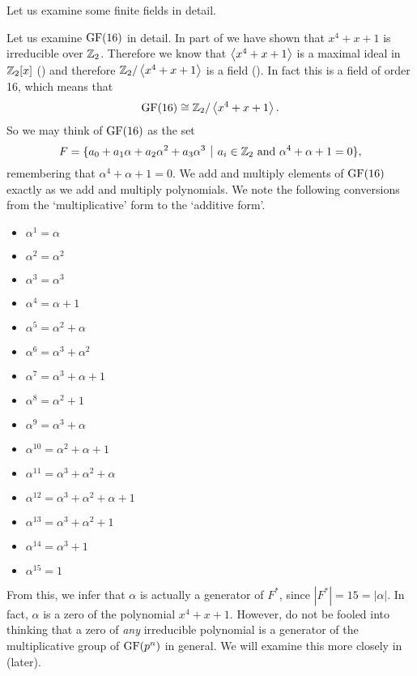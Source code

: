 Let us examine some finite fields in detail.
\begin{example}\label{example-GF16-analysis}
    Let us examine $\mathrm{GF}(16)$ in detail. In part of  we have shown that $x^4 + x + 1$ is irreducible over $\mathbb{Z}_2$. Therefore we know that $\left\langle x^4 + x + 1\right\rangle$ is a maximal ideal in $\mathbb{Z}_2[x]$ () and therefore $\mathbb{Z}_2/\left\langle x^4+x+1\right\rangle$ is a field (). In fact this is a field of order 16, which means that
    \[
        \mathrm{GF}(16) \cong \mathbb{Z}_2/\left\langle x^4+x+1\right\rangle.
    \]
    So we may think of $\mathrm{GF}(16)$ as the set
    \[
        F = \{a_0 + a_1\alpha + a_2\alpha^2 + a_3\alpha^3 \vert a_i \in \Z_2 \text{ and } \alpha^4 + \alpha + 1 = 0\},
    \]
    remembering that $\alpha^4 + \alpha + 1 = 0$. We add and multiply elements of $\mathrm{GF}(16)$ exactly as we add and multiply polynomials. We note the following conversions from the `multiplicative' form to the `additive form'.
    \begin{multicols}{3}
        \begin{itemize}
            \item $\alpha^1 = \alpha$
            \item $\alpha^2 = \alpha^2$
            \item $\alpha^3 = \alpha^3$
            \item $\alpha^4 = \alpha + 1$
            \item $\alpha^5 = \alpha^2 + \alpha$
            \item $\alpha^6 = \alpha^3 + \alpha^2$
            \item $\alpha^7 = \alpha^3 + \alpha + 1$
            \item $\alpha^8 = \alpha^2 + 1$
            \item $\alpha^9 = \alpha^3 + \alpha$
            \item $\alpha^{10} = \alpha^2 + \alpha + 1$
            \item $\alpha^{11} = \alpha^3 + \alpha^2 + \alpha$
            \item $\alpha^{12} = \alpha^3 + \alpha^2 + \alpha + 1$
            \item $\alpha^{13} = \alpha^3 + \alpha^2 + 1$
            \item $\alpha^{14} = \alpha^3 + 1$
            \item $\alpha^{15} = 1$
        \end{itemize}
    \end{multicols}
    From this, we infer that $\alpha$ is actually a generator of $F^\ast$, since $|F^\ast| = 15 = |\alpha|$. In fact, $\alpha$ is a zero of the polynomial $x^4 + x + 1$. However, do not be fooled into thinking that a zero of \textit{any} irreducible polynomial is a generator of the multiplicative group of $\mathrm{GF}(p^n)$ in general. We will examine this more closely in  (later).


\end{example}

